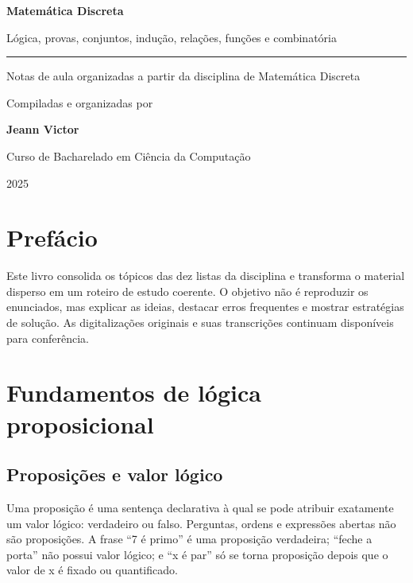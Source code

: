 \documentclass[12pt,a4paper,openany]{book}
\begin{document}
\begin{titlepage}
\centering
\vspace*{3cm}
{\Huge\bfseries\color{azul} Matemática Discreta\par}
\vspace{1cm}
{\LARGE\color{laranja} Lógica, provas, conjuntos, indução, relações, funções e combinatória\par}
\vspace{2cm}\rule{0.65\textwidth}{0.4pt}\par\vspace{1.5cm}
{\Large Notas de aula organizadas a partir da disciplina de Matemática Discreta\par}
\vspace{1cm}
{\large Compiladas e organizadas por\par}\vspace{0.3cm}
{\Large\bfseries Jeann Victor\par}
\vfill
{\large Curso de Bacharelado em Ciência da Computação\par}
{\large 2025\par}
\end{titlepage}
\frontmatter
\chapter*{Prefácio}
Este livro consolida os tópicos das dez listas da disciplina e transforma o material disperso em um roteiro de estudo coerente. O objetivo não é reproduzir os enunciados, mas explicar as ideias, destacar erros frequentes e mostrar estratégias de solução. As digitalizações originais e suas transcrições continuam disponíveis para conferência.
\tableofcontents
\mainmatter
\chapter{Fundamentos de lógica proposicional}



\section{Proposições e valor lógico}



Uma proposição é uma sentença declarativa à qual se pode atribuir exatamente um valor lógico: verdadeiro ou falso. Perguntas, ordens e expressões abertas não são proposições. A frase “7 é primo” é uma proposição verdadeira; “feche a porta” não possui valor lógico; e “x é par” só se torna proposição depois que o valor de x é fixado ou quantificado.
\end{document}
